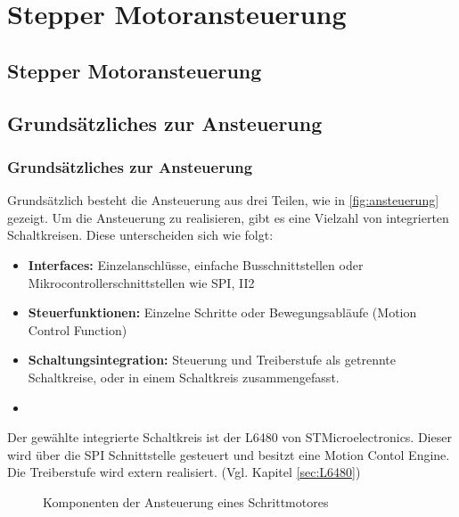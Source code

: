 \ifSTANDALONE
\section{Stepper Motoransteuerung}
\fi
\ifEMBED
\subsection{Stepper Motoransteuerung}
\fi

\ifEMBED
    \BLDCcollab
\fi
\ifSTANDALONE
    \subsection{Grundsätzliches zur Ansteuerung}\label{subsec:Ansteuerung}
\fi
\ifEMBED
    \subsubsection{Grundsätzliches zur Ansteuerung}\label{subsec:Ansteuerung}
\fi
	Grundsätzlich besteht die Ansteuerung aus drei Teilen, wie in 
    \autoref*{fig:ansteuerung} gezeigt. 
    Um die Ansteuerung zu realisieren, gibt es eine Vielzahl von 
    integrierten Schaltkreisen. Diese unterscheiden sich wie folgt: 
    \begin{itemize}
    	\item \textbf{Interfaces:} Einzelanschlüsse, einfache 
            Busschnittstellen oder Mikrocontrollerschnittstellen wie SPI, 
            II2
    	\item \textbf{Steuerfunktionen:} Einzelne Schritte oder 
            Bewegungsabläufe (Motion Control Function)
    	\item \textbf{Schaltungsintegration:} Steuerung und Treiberstufe als 
            getrennte Schaltkreise, oder in einem Schaltkreis zusammengefasst. 
        \item[] \cite{Doku:Stepper} 
    \end{itemize}
    
    \noindent
    Der gewählte integrierte Schaltkreis ist der L6480 von 
    STMicroelectronics. Dieser wird über die SPI Schnittstelle gesteuert 
    und besitzt eine Motion Contol Engine. Die Treiberstufe wird extern 
    realisiert. (Vgl. Kapitel \ref{sec:L6480}) 
	\begin{figure}[h!]
		\centering
		\caption{Komponenten der Ansteuerung eines Schrittmotores}
		\label{fig:ansteuerung}
	\end{figure}
    
